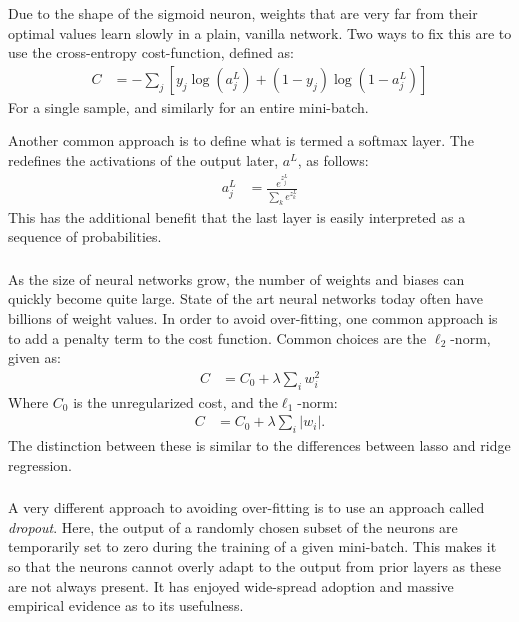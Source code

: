 \documentclass[xetex,mathserif,serif,aspectratio=169]{beamer}
\begin{document}
\begin{frame}[fragile] \frametitle{} \oldB \small

\textbf{}

Due to the shape of the sigmoid neuron, weights that are very far from
their optimal values learn slowly in a plain, vanilla network. Two ways
to fix this are to use the cross-entropy cost-function, defined as:
\begin{align*}
C &= - \sum_j \left[ y_j \log(a_j^L) + (1-y_j) \log(1 - a_j^L) \right]
\end{align*}
For a single sample, and similarly for an entire mini-batch.

Another common approach is to define what is termed a softmax layer.
The redefines the activations of the output later, $a^L$, as follows:
\begin{align*}
a^L_j &= \frac{e^{z_j^L}}{\sum_k e^{z_k^L}}
\end{align*}
This has the additional benefit that the last layer is easily interpreted
as a sequence of probabilities.

\end{frame}

\begin{frame}[fragile] \frametitle{} \oldB \small

\textbf{}

As the size of neural networks grow, the number of weights and biases can
quickly become quite large. State of the art neural networks today often
have billions of weight values. In order to avoid over-fitting, one common
approach is to add a penalty term to the cost function. Common choices are
the $\ell_2$-norm, given as:
\begin{align*}
C &= C_0 + \lambda \sum_i w_i^2
\end{align*}
Where $C_0$ is the unregularized cost, and the$\ell_1$-norm:
\begin{align*}
C &= C_0 + \lambda \sum_i |w_i|.
\end{align*}
The distinction between these is similar to the differences between lasso and
ridge regression.

\end{frame}

\begin{frame}[fragile] \frametitle{} \oldB \small

\textbf{}

A very different approach to avoiding over-fitting is to use an approach called
\textit{dropout}. Here, the output of a randomly chosen subset of the neurons
are temporarily set to zero during the training of a given mini-batch. This makes
it so that the neurons cannot overly adapt to the output from prior layers as
these are not always present. It has enjoyed wide-spread adoption and massive
empirical evidence as to its usefulness.

\end{frame}
\end{document}
